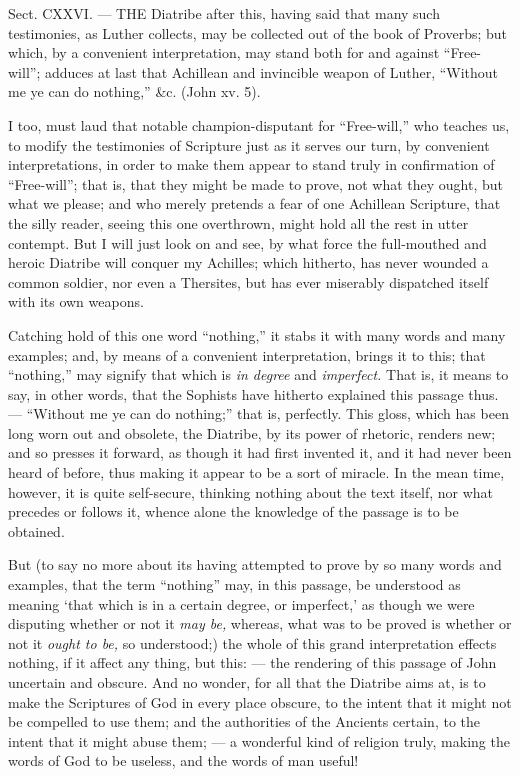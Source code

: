 
Sect. CXXVI. — THE Diatribe after this, having said that many such testimonies, as Luther collects, may be collected out of the book of Proverbs; but which, by a convenient interpretation, may stand both for and against “Free-will”; adduces at last that Achillean and invincible weapon of Luther, “Without me ye can do nothing,” \&c. (John xv. 5).

I too, must laud that notable champion-disputant for “Free-will,” who teaches us, to modify the testimonies of Scripture just as it serves our turn, by convenient interpretations, in order to make them appear to stand truly in confirmation of “Free-will”; that is, that they might be made to prove, not what they ought, but what we please; and who merely pretends a fear of one Achillean Scripture, that the silly reader, seeing this one overthrown, might hold all the rest in utter contempt. But I will just look on and see, by what force the full-mouthed and heroic Diatribe will conquer my Achilles; which hitherto, has never wounded a common soldier, nor even a Thersites, but has ever miserably dispatched itself with its own weapons.

Catching hold of this one word “nothing,” it stabs it with many words and many examples; and, by means of a convenient interpretation, brings it to this; that “nothing,” may signify that which is \emph{in degree }and \emph{imperfect. }That is, it means to say, in other words, that the Sophists have hitherto explained this passage thus. — “Without me ye can do nothing;” that is, perfectly. This gloss, which has been long worn out and obsolete, the Diatribe, by its power of rhetoric, renders new; and so presses it forward, as though it had first invented it, and it had never been heard of before, thus making it appear to be a sort of miracle. In the mean time, however, it is quite self-secure, thinking nothing about the text itself, nor what precedes or follows it, whence alone the knowledge of the passage is to be obtained.

But (to say no more about its having attempted to prove by so many words and examples, that the term “nothing” may, in this passage, be understood as meaning ‘that which is in a certain degree, or imperfect,’ as though we were disputing whether or not it \emph{may be, }whereas, what was to be proved is whether or not it \emph{ought to be, }so understood;) the whole of this grand interpretation effects nothing, if it affect any thing, but this: — the rendering of this passage of John uncertain and obscure. And no wonder, for all that the Diatribe aims at, is to make the Scriptures of God in every place obscure, to the intent that it might not be compelled to use them; and the authorities of the Ancients certain, to the intent that it might abuse them; — a wonderful kind of religion truly, making the words of God to be useless, and the words of man useful!

